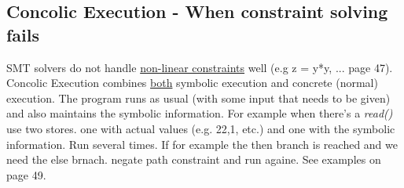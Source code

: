\subsection{Concolic Execution - When constraint solving fails}
SMT solvers do not handle \underline{non-linear constraints} well (e.g z = y*y, ... page 47).
Concolic Execution combines \underline{both} symbolic execution and concrete (normal) execution. The program runs as usual (with some input that needs to be given) and also maintains the symbolic information. For example when there's a \textit{read()} use two stores. one with actual values (e.g. 22,1, etc.) and one with the symbolic information. Run several times. If for example the then branch is reached and we need the else brnach. negate path constraint and run againe. See examples on page 49.